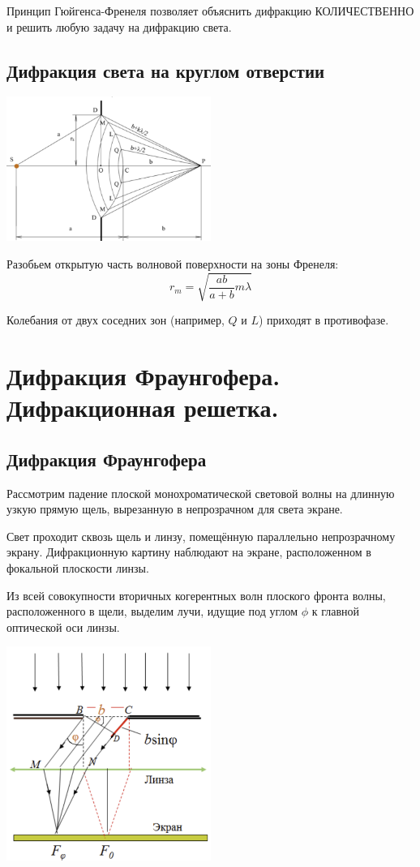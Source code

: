 \documentclass[12pt]{report}
\begin{document}
Принцип Гюйгенса-Френеля позволяет объяснить дифракцию КОЛИЧЕСТВЕННО и решить любую задачу на дифракцию света.

\subsection{Дифракция света на круглом отверстии}
\begin{center}
    \includegraphics[width=0.5\textwidth]{graphics/05_2.png}
\end{center}
Разобьем открытую часть волновой поверхности на зоны Френеля:
\[
    r_m = \sqrt{\dfrac{ab}{a + b}m\lambda}
\]

Колебания от двух соседних зон (например, $Q$ и $L$) приходят в противофазе.

\section{Дифракция Фраунгофера. Дифракционная решетка.}

\subsection{Дифракция Фраунгофера}
Рассмотрим падение плоской монохроматической световой волны на длинную узкую прямую щель, вырезанную в непрозрачном для света экране.

Свет проходит сквозь щель и линзу, помещённую параллельно непрозрачному экрану.  Дифракционную картину наблюдают на экране, расположенном в фокальной плоскости линзы.

Из всей совокупности вторичных когерентных волн плоского фронта волны, расположенного в щели, выделим лучи, идущие под углом $\phi$ к главной
оптической оси линзы.

\begin{center}
    \includegraphics[width=0.5\textwidth]{graphics/06_2.png}
\end{center}
\end{document}
